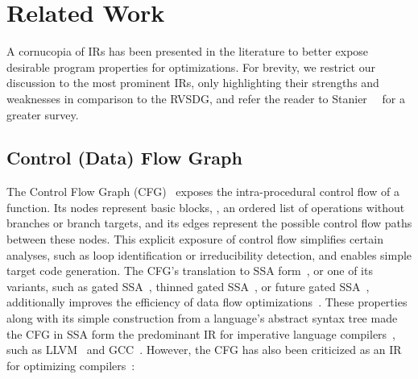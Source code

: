 \section{Related Work}\label{sec:relwork}


A cornucopia of IRs has been presented in the literature to better expose desirable
program properties for optimizations. For brevity, we restrict our discussion to the
most prominent IRs, only highlighting their strengths and weaknesses in comparison to
the RVSDG, and refer the reader to Stanier~\etal~\cite{Stanier13} for a greater survey.

\subsection{Control (Data) Flow Graph}
The Control Flow Graph (CFG)~\cite{Allen70} exposes the intra-procedural control flow of a
function. Its nodes represent basic blocks, \ie, an ordered list of operations without
branches or branch targets, and its edges represent the possible control flow paths between these
nodes. This explicit exposure of control flow simplifies certain analyses, such as loop
identification or irreducibility detection, and enables simple target code generation. The CFG's
translation to SSA form~\cite{Cytron91}, or one of its variants, such as gated SSA~\cite{Tu95},
thinned gated SSA~\cite{Havlak93}, or future gated SSA~\cite{Ding14}, additionally improves the
efficiency of data flow optimizations~\cite{Wegman91,Rosen88}. These properties along with its
simple construction from a language's abstract syntax tree made the CFG in SSA form the predominant
IR for imperative language compilers~\cite{Stanier13}, such as LLVM~\cite{Lattner04} and
GCC~\cite{gcc}. However, the CFG has also been criticized as an IR for optimizing
compilers~\cite{Ferrante87,Johnson03,Johnson04,Lawrence07,Weise94,Zaidi15,Zaidi15-2}:

